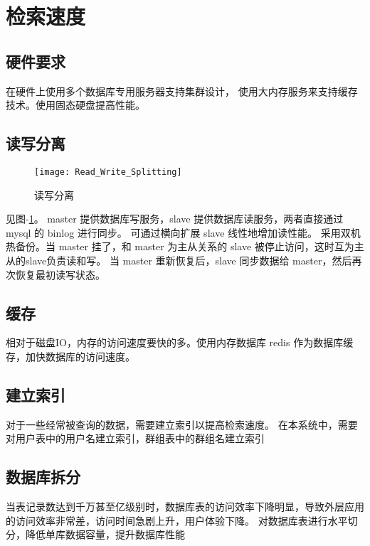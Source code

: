 {\color{red}
\section{检索速度}

\subsection{硬件要求}
在硬件上使用多个数据库专用服务器支持集群设计，
使用大内存服务来支持缓存技术。使用固态硬盘提高性能。


\subsection{读写分离}

\begin{figure}[h]
	\centering
	\texttt{[image: Read\_Write\_Splitting]}
	\caption{读写分离} \label{fig:Read_Write_Splitting}
\end{figure}

见图-\ref{fig:Read_Write_Splitting}。
master 提供数据库写服务，slave 提供数据库读服务，两者直接通过 mysql 的 binlog 进行同步。
可通过横向扩展 slave 线性地增加读性能。
采用双机热备份。当 master 挂了，和 master 为主从关系的 slave 被停止访问，这时互为主从的slave负责读和写。
当 master 重新恢复后，slave 同步数据给 master，然后再次恢复最初读写状态。


\subsection{缓存}
相对于磁盘IO，内存的访问速度要快的多。使用内存数据库 redis 作为数据库缓存，加快数据库的访问速度。


\subsection{建立索引}
对于一些经常被查询的数据，需要建立索引以提高检索速度。
在本系统中，需要对用户表中的用户名建立索引，群组表中的群组名建立索引


\subsection{数据库拆分}
当表记录数达到千万甚至亿级别时，数据库表的访问效率下降明显，导致外层应用的访问效率非常差，访问时间急剧上升，用户体验下降。
对数据库表进行水平切分，降低单库数据容量，提升数据库性能


}